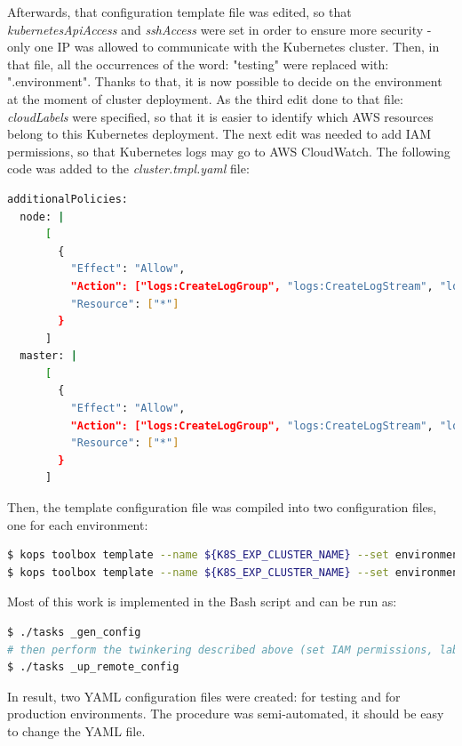 Afterwards, that configuration template file was edited, so that \textit{kubernetesApiAccess} and \textit{sshAccess} were set in order to ensure more security - only one IP was allowed to communicate with the Kubernetes cluster. Then, in that file, all the occurrences of the word: "testing" were replaced with: "{{.environment}}". Thanks to that, it is now possible to decide on the environment at the moment of cluster deployment. As the third edit done to that file: \textit{cloudLabels} were specified, so that it is easier to identify which AWS resources belong to this Kubernetes deployment\cite{online-kops-labels}. The next edit was needed to add IAM permissions, so that Kubernetes logs may go to AWS CloudWatch. The following code was added to the \textit{cluster.tmpl.yaml} file:
\begin{lstlisting}[basicstyle=\tiny,caption={TODO},captionpos=b,language=Bash,xleftmargin=1cm]
additionalPolicies:
  node: |
      [
        {
          "Effect": "Allow",
          "Action": ["logs:CreateLogGroup", "logs:CreateLogStream", "logs:PutLogEvents", "logs:DescribeLogGroups", "logs:DescribeLogStreams"],
          "Resource": ["*"]
        }
      ]
  master: |
      [
        {
          "Effect": "Allow",
          "Action": ["logs:CreateLogGroup", "logs:CreateLogStream", "logs:PutLogEvents", "logs:DescribeLogGroups", "logs:DescribeLogStreams"],
          "Resource": ["*"]
        }
      ]
\end{lstlisting}

Then, the template configuration file was compiled into two configuration files, one for each environment:
\begin{lstlisting}[basicstyle=\tiny,caption={TODO},captionpos=b,language=Bash,xleftmargin=1cm]
$ kops toolbox template --name ${K8S_EXP_CLUSTER_NAME} --set environment=testing --template cluster.tmpl.yaml --format-yaml > cluster-testing.yaml
$ kops toolbox template --name ${K8S_EXP_CLUSTER_NAME} --set environment=production --template cluster.tmpl.yaml --format-yaml > cluster-production.yaml
\end{lstlisting}
Most of this work is implemented in the Bash script and can be run as:
\begin{lstlisting}[basicstyle=\tiny,caption={TODO},captionpos=b,language=Bash,xleftmargin=1cm]
$ ./tasks _gen_config
# then perform the twinkering described above (set IAM permissions, labels and security settings)
$ ./tasks _up_remote_config
\end{lstlisting}

In result, two YAML configuration files were created: for testing and for production environments. The procedure was semi-automated, it should be easy to change the YAML file.

